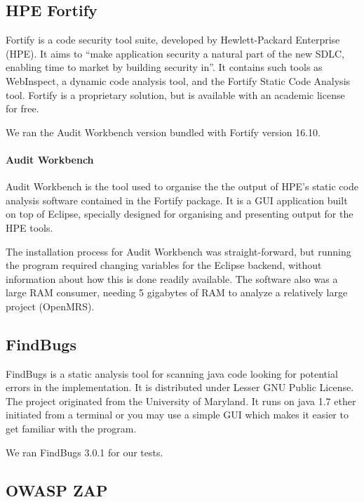 \documentclass{article}
\begin{document}
\subsection{HPE Fortify}

  Fortify is a code security tool suite, developed by Hewlett-Packard
  Enterprise (HPE). It aims to ``make application security a natural part of the new
  SDLC, enabling time to market by building security in''\autocite[]{Fortify}.
  It contains such tools as WebInspect, a dynamic code analysis tool, and the
  Fortify Static Code Analysis tool. Fortify is a proprietary solution, but is
  available with an academic license for free.

  We ran the Audit Workbench version bundled with Fortify version 16.10.

\paragraph{Audit Workbench}

  Audit Workbench is the tool used to organise the the output of HPE's static
  code analysis software contained in the Fortify package. It is a GUI
  application built on top of Eclipse, specially designed for organising and
  presenting output for the HPE tools. 
  
  The installation process for Audit Workbench was straight-forward, but running
  the program required changing variables for the Eclipse backend, without
  information about how this is done readily available. The software also was a
  large RAM consumer, needing 5 gigabytes of RAM to analyze a relatively large
  project (OpenMRS).

\subsection{FindBugs}

FindBugs is a static analysis tool for scanning java code looking for potential errors in the
implementation. It is distributed under Lesser GNU Public License. The project
originated from the University of Maryland.\autocite[]{FindBugs} It runs on java
1.7 ether initiated from a terminal or you may use a simple GUI which makes it
easier to get familiar with the program. 

We ran FindBugs 3.0.1 for our tests.
 

\subsection{OWASP ZAP}
\end{document}

